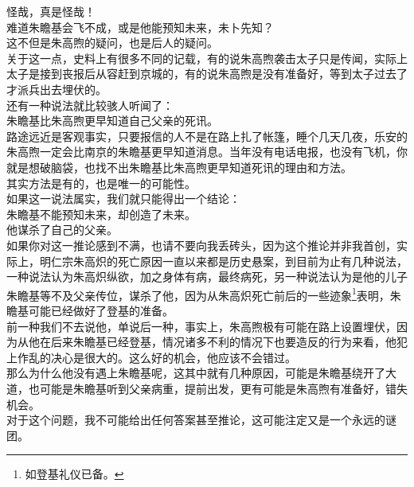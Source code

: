 \begin{multicols}{\theparacolNo}
怪哉，真是怪哉！\\

难道朱瞻基会飞不成，或是他能预知未来，未卜先知？\\

这不但是朱高煦的疑问，也是后人的疑问。\\

关于这一点，史料上有很多不同的记载，有的说朱高煦袭击太子只是传闻，实际上太子是接到丧报后从容赶到京城的，有的说朱高煦是没有准备好，等到太子过去了才派兵出去埋伏的。\\

还有一种说法就比较骇人听闻了：\\

朱瞻基比朱高煦更早知道自己父亲的死讯。\\

路途远近是客观事实，只要报信的人不是在路上扎了帐篷，睡个几天几夜，乐安的朱高煦一定会比南京的朱瞻基更早知道消息。当年没有电话电报，也没有飞机，你就是想破脑袋，也找不出朱瞻基比朱高煦更早知道死讯的理由和方法。\\

其实方法是有的，也是唯一的可能性。\\

如果这一说法属实，我们就只能得出一个结论：\\

朱瞻基不能预知未来，却创造了未来。\\

他谋杀了自己的父亲。\\

如果你对这一推论感到不满，也请不要向我丢砖头，因为这个推论并非我首创，实际上，明仁宗朱高炽的死亡原因一直以来都是历史悬案，到目前为止有几种说法，一种说法认为朱高炽纵欲，加之身体有病，最终病死，另一种说法认为是他的儿子朱瞻基等不及父亲传位，谋杀了他，因为从朱高炽死亡前后的一些迹象\footnote{如登基礼仪已备。}表明，朱瞻基可能已经做好了登基的准备。\\

前一种我们不去说他，单说后一种，事实上，朱高煦极有可能在路上设置埋伏，因为从他在后来朱瞻基已经登基，情况诸多不利的情况下也要造反的行为来看，他犯上作乱的决心是很大的。这么好的机会，他应该不会错过。\\

那么为什么他没有遇上朱瞻基呢，这其中就有几种原因，可能是朱瞻基绕开了大道，也可能是朱瞻基听到父亲病重，提前出发，更有可能是朱高煦有准备好，错失机会。\\

对于这个问题，我不可能给出任何答案甚至推论，这可能注定又是一个永远的谜团。\\


\end{multicols}
